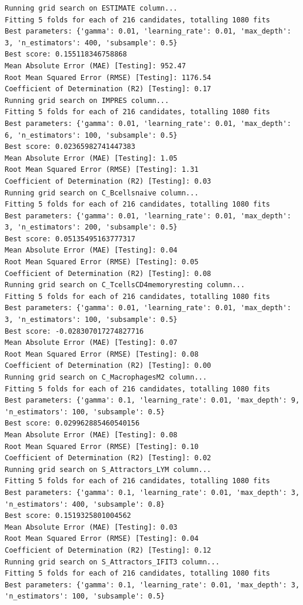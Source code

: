 \documentclass[
  letterpaper,
  DIV=11,
  numbers=noendperiod]{scrartcl}
\begin{document}
\begin{verbatim}
Running grid search on ESTIMATE column...
Fitting 5 folds for each of 216 candidates, totalling 1080 fits
Best parameters: {'gamma': 0.01, 'learning_rate': 0.01, 'max_depth': 3, 'n_estimators': 400, 'subsample': 0.5}
Best score: 0.155118346758868
Mean Absolute Error (MAE) [Testing]: 952.47
Root Mean Squared Error (RMSE) [Testing]: 1176.54
Coefficient of Determination (R2) [Testing]: 0.17
Running grid search on IMPRES column...
Fitting 5 folds for each of 216 candidates, totalling 1080 fits
Best parameters: {'gamma': 0.01, 'learning_rate': 0.01, 'max_depth': 6, 'n_estimators': 100, 'subsample': 0.5}
Best score: 0.02365982741447383
Mean Absolute Error (MAE) [Testing]: 1.05
Root Mean Squared Error (RMSE) [Testing]: 1.31
Coefficient of Determination (R2) [Testing]: 0.03
Running grid search on C_Bcellsnaive column...
Fitting 5 folds for each of 216 candidates, totalling 1080 fits
Best parameters: {'gamma': 0.01, 'learning_rate': 0.01, 'max_depth': 3, 'n_estimators': 200, 'subsample': 0.5}
Best score: 0.05135495163777317
Mean Absolute Error (MAE) [Testing]: 0.04
Root Mean Squared Error (RMSE) [Testing]: 0.05
Coefficient of Determination (R2) [Testing]: 0.08
Running grid search on C_TcellsCD4memoryresting column...
Fitting 5 folds for each of 216 candidates, totalling 1080 fits
Best parameters: {'gamma': 0.01, 'learning_rate': 0.01, 'max_depth': 3, 'n_estimators': 100, 'subsample': 0.5}
Best score: -0.028307017274827716
Mean Absolute Error (MAE) [Testing]: 0.07
Root Mean Squared Error (RMSE) [Testing]: 0.08
Coefficient of Determination (R2) [Testing]: 0.00
Running grid search on C_MacrophagesM2 column...
Fitting 5 folds for each of 216 candidates, totalling 1080 fits
Best parameters: {'gamma': 0.1, 'learning_rate': 0.01, 'max_depth': 9, 'n_estimators': 100, 'subsample': 0.5}
Best score: 0.029962885460540156
Mean Absolute Error (MAE) [Testing]: 0.08
Root Mean Squared Error (RMSE) [Testing]: 0.10
Coefficient of Determination (R2) [Testing]: 0.02
Running grid search on S_Attractors_LYM column...
Fitting 5 folds for each of 216 candidates, totalling 1080 fits
Best parameters: {'gamma': 0.1, 'learning_rate': 0.01, 'max_depth': 3, 'n_estimators': 400, 'subsample': 0.8}
Best score: 0.1519325801004562
Mean Absolute Error (MAE) [Testing]: 0.03
Root Mean Squared Error (RMSE) [Testing]: 0.04
Coefficient of Determination (R2) [Testing]: 0.12
Running grid search on S_Attractors_IFIT3 column...
Fitting 5 folds for each of 216 candidates, totalling 1080 fits
Best parameters: {'gamma': 0.1, 'learning_rate': 0.01, 'max_depth': 3, 'n_estimators': 100, 'subsample': 0.5}

\end{verbatim}
\end{document}
